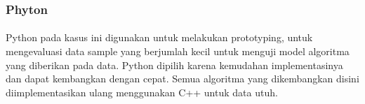 \documentclass{article}
\begin{document}
\subsubsection{Phyton}

\paragraph{}
Python pada kasus ini digunakan untuk melakukan prototyping, untuk mengevaluasi data sample yang berjumlah kecil untuk menguji model algoritma yang diberikan pada data. Python dipilih karena kemudahan implementasinya dan dapat kembangkan dengan cepat. Semua algoritma yang dikembangkan disini diimplementasikan ulang menggunakan C++ untuk data utuh.

	
\end{document}
